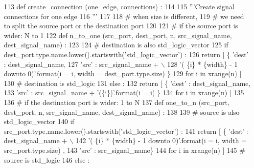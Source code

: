 \begin{DoxyCode}
113 \textcolor{keyword}{def }\hyperlink{namespacesylva_1_1code__generation_1_1hsdf__to__vhdl_a5381a4c2d460f5f0490d0361e37917e9}{create\_connection} (one\_edge, connections) :
114 
115   \textcolor{stringliteral}{'''Create signal connections for one edge}
116 \textcolor{stringliteral}{  '''}
117 
118   \textcolor{comment}{# when size is different,}
119   \textcolor{comment}{# we need to split the source port or the destination port}
120 
121   \textcolor{comment}{# if the source port is wider: N to 1}
122   \textcolor{keyword}{def }n\_to\_one (src\_port, dest\_port, n, src\_signal\_name, dest\_signal\_name) :
123 
124     \textcolor{comment}{# destination is also std\_logic\_vector}
125     \textcolor{keywordflow}{if} dest\_port.type.name.lower().startswith(\textcolor{stringliteral}{'std\_logic\_vector'}) :
126       \textcolor{keywordflow}{return} [ \{ \textcolor{stringliteral}{'dest'} : dest\_signal\_name,
127                  \textcolor{stringliteral}{'src'}  : src\_signal\_name + \(\backslash\)
128                  \textcolor{stringliteral}{'( \{i\} * \{width\} - 1 downto 0)'}.format(i = i, width = dest\_port.type.size) \}
129                \textcolor{keywordflow}{for} i \textcolor{keywordflow}{in} xrange(n) ]
130     \textcolor{comment}{# destination is std\_logic}
131     \textcolor{keywordflow}{else} :
132       \textcolor{keywordflow}{return} [ \{ \textcolor{stringliteral}{'dest'} : dest\_signal\_name,
133                  \textcolor{stringliteral}{'src'}  : src\_signal\_name + \textcolor{stringliteral}{'(\{i\})'}.format(i = i) \}
134                \textcolor{keywordflow}{for} i \textcolor{keywordflow}{in} xrange(n) ]
135 
136   \textcolor{comment}{# if the destination port is wider: 1 to N}
137   \textcolor{keyword}{def }one\_to\_n (src\_port, dest\_port, n, src\_signal\_name, dest\_signal\_name) :
138 
139     \textcolor{comment}{# source is also std\_logic\_vector}
140     \textcolor{keywordflow}{if} src\_port.type.name.lower().startswith(\textcolor{stringliteral}{'std\_logic\_vector'}) :
141       \textcolor{keywordflow}{return} [ \{ \textcolor{stringliteral}{'dest'} : dest\_signal\_name + \(\backslash\)
142                  \textcolor{stringliteral}{'( \{i\} * \{width\} - 1 downto 0)'}.format(i = i, width = src\_port.type.size) ,
143                  \textcolor{stringliteral}{'src'}  : src\_signal\_name\}
144                \textcolor{keywordflow}{for} i \textcolor{keywordflow}{in} xrange(n) ]
145     \textcolor{comment}{# source is std\_logic}
146     \textcolor{keywordflow}{else} :

\end{DoxyCode}

